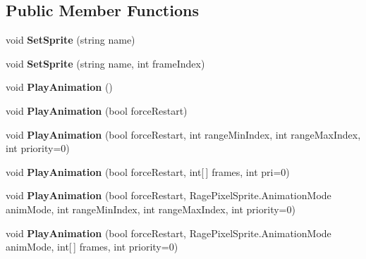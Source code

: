 \subsection*{Public Member Functions}
\begin{DoxyCompactItemize}
\item 
\hypertarget{interface_i_rage_pixel_aa84818acdc7e9d2ef80230323d1fc050}{void {\bfseries Set\-Sprite} (string name)}\label{interface_i_rage_pixel_aa84818acdc7e9d2ef80230323d1fc050}

\item 
\hypertarget{interface_i_rage_pixel_a47e40c8dbd24bf9ab622ac7043073035}{void {\bfseries Set\-Sprite} (string name, int frame\-Index)}\label{interface_i_rage_pixel_a47e40c8dbd24bf9ab622ac7043073035}

\item 
\hypertarget{interface_i_rage_pixel_a0879278adb76f52123970c44ebac453b}{void {\bfseries Play\-Animation} ()}\label{interface_i_rage_pixel_a0879278adb76f52123970c44ebac453b}

\item 
\hypertarget{interface_i_rage_pixel_a9d87548ffed46340c0f6d711b7c59991}{void {\bfseries Play\-Animation} (bool force\-Restart)}\label{interface_i_rage_pixel_a9d87548ffed46340c0f6d711b7c59991}

\item 
\hypertarget{interface_i_rage_pixel_a4061820f2995a1eace11719a6c32e173}{void {\bfseries Play\-Animation} (bool force\-Restart, int range\-Min\-Index, int range\-Max\-Index, int priority=0)}\label{interface_i_rage_pixel_a4061820f2995a1eace11719a6c32e173}

\item 
\hypertarget{interface_i_rage_pixel_a107544fa8c2f3f4a2913a39926253dbd}{void {\bfseries Play\-Animation} (bool force\-Restart, int\mbox{[}$\,$\mbox{]} frames, int pri=0)}\label{interface_i_rage_pixel_a107544fa8c2f3f4a2913a39926253dbd}

\item 
\hypertarget{interface_i_rage_pixel_a57974dc9e9794eda716f2c52471f3a5b}{void {\bfseries Play\-Animation} (bool force\-Restart, Rage\-Pixel\-Sprite.\-Animation\-Mode anim\-Mode, int range\-Min\-Index, int range\-Max\-Index, int priority=0)}\label{interface_i_rage_pixel_a57974dc9e9794eda716f2c52471f3a5b}

\item 
\hypertarget{interface_i_rage_pixel_a38386cb8b12865b0754fb5e0d326e869}{void {\bfseries Play\-Animation} (bool force\-Restart, Rage\-Pixel\-Sprite.\-Animation\-Mode anim\-Mode, int\mbox{[}$\,$\mbox{]} frames, int priority=0)}\label{interface_i_rage_pixel_a38386cb8b12865b0754fb5e0d326e869}


\end{DoxyCompactItemize}
